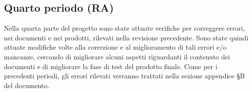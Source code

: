 \documentclass[../piano-di-qualifica.tex]{subfiles}
\begin{document}
\subsection{Quarto periodo (RA)}
\label{sub:quarto_periodo}
Nella quarta parte del progetto sono state attuate verifiche per correggere errori, nei documenti e nei prodotti, rilevati nella revisione precedente.
Sono state quindi attuate modifiche volte alla correzione e al miglioramento di tali errori e/o mancanze, cercando di migliorare alcuni aspetti riguardanti il contenuto dei documenti e di migliorare la fase di test del prodotto finale.
Come per i precedenti periodi, gli errori rilevati verranno trattati nella sezione appendice §B del documento.

\end{document}

